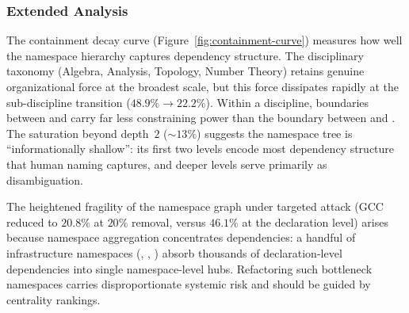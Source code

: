 \subsubsection{Extended Analysis}\label{app:ns-analysis}

The containment decay curve (Figure~\ref{fig:containment-curve}) measures how well the namespace hierarchy captures dependency structure. The disciplinary taxonomy (Algebra, Analysis, Topology, Number Theory) retains genuine organizational force at the broadest scale, but this force dissipates rapidly at the sub-discipline transition ($48.9\% \to 22.2\%$). Within a discipline, boundaries between  and  carry far less constraining power than the boundary between  and . The saturation beyond depth~$2$ (${\sim}13\%$) suggests the namespace tree is ``informationally shallow'': its first two levels encode most dependency structure that human naming captures, and deeper levels serve primarily as disambiguation.

The heightened fragility of the namespace graph under targeted attack (GCC reduced to $20.8\%$ at $20\%$ removal, versus $46.1\%$ at the declaration level) arises because namespace aggregation concentrates dependencies: a handful of infrastructure namespaces (, , ) absorb thousands of declaration-level dependencies into single namespace-level hubs. Refactoring such bottleneck namespaces carries disproportionate systemic risk and should be guided by centrality rankings.

